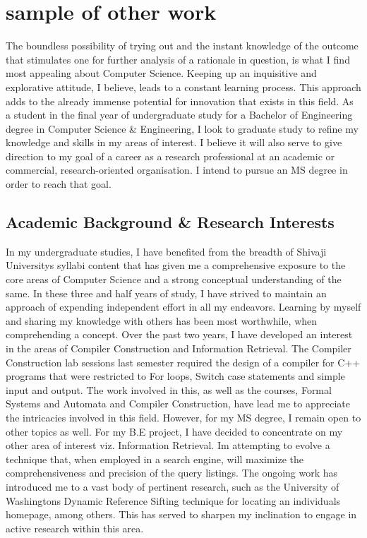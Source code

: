 \documentclass[a4paper,12pt]{article}%
\begin{document}
	  \hrulefill
	  
	  \hrulefill
	  \newpage
	  \section{ sample of other work}
The boundless possibility of trying out and the instant knowledge of the outcome that stimulates one for further analysis of a rationale in question, is what I find most appealing about Computer Science. Keeping up an inquisitive and explorative attitude, I believe, leads to a constant learning process. This approach adds to the already immense potential for innovation that exists in this field.
As a student in the final year of undergraduate study for a Bachelor of Engineering degree in Computer Science \& Engineering, I look to graduate study to refine my knowledge and skills in my areas of interest. I believe it will also serve to give direction to my goal of a career as a research professional at an academic or commercial, research-oriented organisation. I intend to pursue an MS degree in order to reach that goal.
 \subsection{ Academic Background \& Research Interests}
 In my undergraduate studies, I have benefited from the breadth of Shivaji Universitys syllabi content that has given me a comprehensive exposure to the core areas of Computer Science and a strong conceptual understanding of the same. In these three and half years of study, I have strived to maintain an approach of expending independent effort in all my endeavors. Learning by myself and sharing my knowledge with others has been most worthwhile, when comprehending a concept.
 Over the past two years, I have developed an interest in the areas of Compiler Construction and Information Retrieval. The Compiler Construction lab sessions last semester required the design of a compiler for C++ programs that were restricted to For loops, Switch case statements and simple input and output. The work involved in this, as well as the courses, Formal Systems and Automata and Compiler Construction, have lead me to appreciate the intricacies involved in this field. However, for my MS degree, I remain open to other topics as well.
  For my B.E project, I have decided to concentrate on my other area of interest viz. Information Retrieval. Im attempting to evolve a technique that, when employed in a search engine, will maximize the comprehensiveness and precision of the query listings. The ongoing work has introduced me to a vast body of pertinent research, such as the University of Washingtons Dynamic Reference Sifting technique for locating an individuals homepage, among others. This has served to sharpen my inclination to engage in active research within this area.
\end{document}

